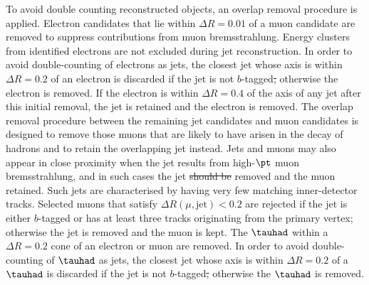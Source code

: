 \documentclass[PAPER, coverpage, atlasdraft=true, texlive=2016, UKenglish]{\ATLASLATEXPATH atlasdoc}
\providecommand{\DIFadd}[1]{{\protect\color{blue}\uwave{#1}}} %
\providecommand{\DIFdel}[1]{{\protect\color{red}\sout{#1}}}                      %
\providecommand{\DIFaddbegin}{} %
\providecommand{\DIFaddend}{} %
\providecommand{\DIFdelbegin}{} %
\providecommand{\DIFdelend}{} %
\begin{document}
To avoid double counting reconstructed objects, an overlap removal procedure is applied.
Electron candidates that lie 
within $\Delta R = 0.01$ of a muon candidate are removed to suppress contributions from muon bremsstrahlung. 
Energy clusters from identified electrons are not excluded during jet reconstruction. 
In order to avoid double-counting of electrons as jets, the closest jet whose axis is within ${\Delta}R = 0.2$ of an electron 
is discarded if the jet is not $b$-tagged\DIFdelbegin \DIFdel{, }\DIFdelend \DIFaddbegin \DIFadd{; }\DIFaddend otherwise the electron is removed.
If the electron is within ${\Delta}R = 0.4$ of the axis of any jet after this initial removal, the jet is retained and  the electron is removed.
The overlap removal procedure between the remaining jet candidates and muon candidates is designed to remove those muons 
that are likely to have arisen in the decay of hadrons and to retain the overlapping jet instead. 
Jets and muons may also appear in close proximity when the jet results from high-$\pt$ muon bremsstrahlung, 
and in such cases the jet \DIFdelbegin \DIFdel{should be }\DIFdelend \DIFaddbegin \DIFadd{is }\DIFaddend removed and the muon retained. Such jets are characterised by having very 
few matching inner-detector tracks. Selected muons that satisfy $\Delta R(\mu,{\textrm{jet}}) < 0.2$ are rejected
if the jet is either $b$-tagged or has at least three tracks originating from the primary vertex; otherwise the jet is removed and the muon is kept.
The $\tauhad$ within a $\Delta R=0.2$ cone of an electron or muon are removed.
In order to avoid double-counting of $\tauhad$ as jets, the closest jet whose axis is
within ${\Delta}R = 0.2$ of a $\tauhad$ is discarded if the jet is not $b$-tagged\DIFdelbegin \DIFdel{, }\DIFdelend \DIFaddbegin \DIFadd{; }\DIFaddend otherwise the $\tauhad$ is removed. 
\end{document}
